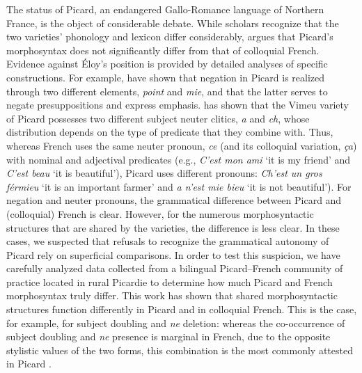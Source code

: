 \documentclass[output=paper,colorlinks,citecolor=brown]{langscibook}
\begin{document}
The status of Picard, an endangered Gallo-Romance language of Northern France, is the object of considerable debate. While scholars recognize that the two varieties’ phonology and lexicon differ considerably, \citet[137]{eloy_constitution_1997} argues that Picard’s morphosyntax does not significantly differ from that of colloquial French. Evidence against Éloy’s position is provided by detailed analyses of specific constructions. For example, \citet{burnett_what_2018} have shown that negation in Picard is realized through two different elements, \textit{point} and \textit{mie}, and that the latter serves to negate presuppositions and express emphasis. \citet{auger_two_nodate} has shown that the Vimeu variety of Picard possesses two different subject neuter clitics, \textit{a} and \textit{ch}, whose distribution depends on the type of predicate that they combine with. Thus, whereas French uses the same neuter pronoun, \textit{ce} (and its colloquial variation, \textit{ça}) with nominal and adjectival predicates (e.g., \textit{C’est mon ami} ‘it is my friend’ and \textit{C’est beau} ‘it is beautiful’), Picard uses different pronouns: \textit{Ch’est un gros férmieu} ‘it is an important farmer’ and \textit{a n’est mie bieu} ‘it is not beautiful’). For negation and neuter pronouns, the grammatical difference between Picard and (colloquial) French is clear. However, for the numerous morphosyntactic structures that are shared by the varieties, the difference is less clear. In these cases, we suspected that refusals to recognize the grammatical autonomy of Picard rely on superficial comparisons. In order to test this suspicion, we have carefully analyzed data collected from a bilingual Picard–French community of practice located in rural Picardie to determine how much Picard and French morphosyntax truly differ. This work has shown that shared morphosyntactic structures function differently in Picard and in colloquial French. This is the case, for example, for subject doubling and \textit{ne} deletion: whereas the co-occurrence of subject doubling and \textit{ne} presence is marginal in French, due to the opposite stylistic values of the two forms, this combination is the most commonly attested in Picard \citep{villeneuve_chtileu_2013}.
\end{document}
